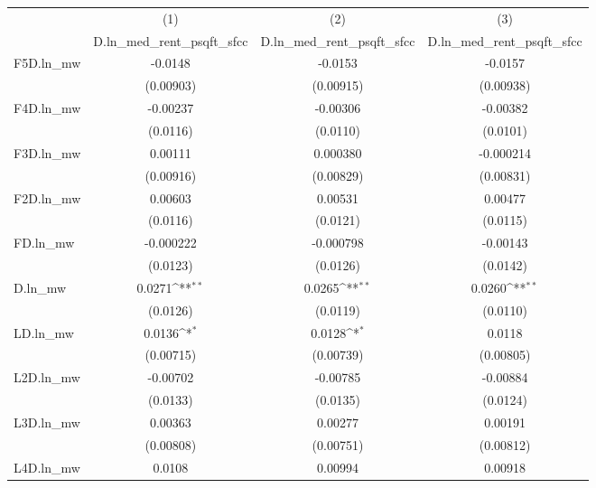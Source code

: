 {
\def\sym#1{\ifmmode^{#1}\else\(^{#1}\)\fi}
\begin{tabular}{l*{3}{c}}
\hline\hline
          &\multicolumn{1}{c}{(1)}&\multicolumn{1}{c}{(2)}&\multicolumn{1}{c}{(3)}\\
          &\multicolumn{1}{c}{D.ln\_med\_rent\_psqft\_sfcc}&\multicolumn{1}{c}{D.ln\_med\_rent\_psqft\_sfcc}&\multicolumn{1}{c}{D.ln\_med\_rent\_psqft\_sfcc}\\
\hline
F5D.ln\_mw &  -0.0148         &  -0.0153         &  -0.0157         \\
          &(0.00903)         &(0.00915)         &(0.00938)         \\
[1em]
F4D.ln\_mw & -0.00237         & -0.00306         & -0.00382         \\
          & (0.0116)         & (0.0110)         & (0.0101)         \\
[1em]
F3D.ln\_mw &  0.00111         & 0.000380         &-0.000214         \\
          &(0.00916)         &(0.00829)         &(0.00831)         \\
[1em]
F2D.ln\_mw &  0.00603         &  0.00531         &  0.00477         \\
          & (0.0116)         & (0.0121)         & (0.0115)         \\
[1em]
FD.ln\_mw  &-0.000222         &-0.000798         & -0.00143         \\
          & (0.0123)         & (0.0126)         & (0.0142)         \\
[1em]
D.ln\_mw   &   0.0271\sym{**} &   0.0265\sym{**} &   0.0260\sym{**} \\
          & (0.0126)         & (0.0119)         & (0.0110)         \\
[1em]
LD.ln\_mw  &   0.0136\sym{*}  &   0.0128\sym{*}  &   0.0118         \\
          &(0.00715)         &(0.00739)         &(0.00805)         \\
[1em]
L2D.ln\_mw & -0.00702         & -0.00785         & -0.00884         \\
          & (0.0133)         & (0.0135)         & (0.0124)         \\
[1em]
L3D.ln\_mw &  0.00363         &  0.00277         &  0.00191         \\
          &(0.00808)         &(0.00751)         &(0.00812)         \\
[1em]
L4D.ln\_mw &   0.0108         &  0.00994         &  0.00918         \\

\end{tabular}}
